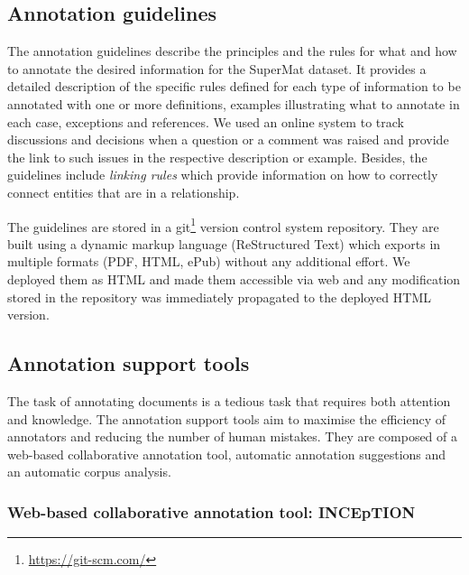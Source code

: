 \documentclass[fleqn,10pt]{wlscirep}
\begin{document}
\subsection*{Annotation guidelines}
\label{subsec:annotation-guidelines}
The annotation guidelines describe the principles and the rules for what and how to annotate the desired information for the SuperMat dataset. It provides a detailed description of the specific rules defined for each type of information to be annotated with one or more definitions, examples illustrating what to annotate in each case, exceptions and references. We used an online system to track discussions and decisions when a question or a comment was raised and provide the link to such issues in the respective description or example. 
Besides, the guidelines include \textit{linking rules} which provide information on how to correctly connect entities that are in a relationship. 

The guidelines are stored in a git\footnote{\url{https://git-scm.com/}} version control system repository. 
They are built using a dynamic markup language (ReStructured Text) which exports in multiple formats (PDF, HTML, ePub) without any additional effort. We deployed them as HTML and made them accessible via web and any modification stored in the repository was immediately propagated to the deployed HTML version. 

\subsection*{Annotation support tools}
\label{subsec:annotation-support-tool}
The task of annotating documents is a tedious task that requires both attention and knowledge.
The annotation support tools aim to maximise the efficiency of annotators and reducing the number of human mistakes. 
They are composed of a web-based collaborative annotation tool, automatic annotation suggestions and an automatic corpus analysis. 

\subsubsection*{Web-based collaborative annotation tool: INCEpTION}
\label{subsec:annotation-tool}
\end{document}
